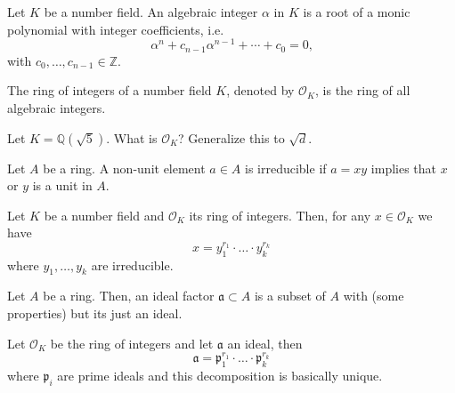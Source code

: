 %
\begin{defbox}
    \begin{definition}
        Let \(K\) be a number field. An algebraic integer \(\alpha\) in \(K\) is a root of a monic polynomial with integer coefficients, i.e.
        \begin{equation}
            \alpha^n + c_{n-1} \alpha^{n-1} + \cdots + c_0 = 0 \text{,}
        \end{equation}
        with \(c_{0}, \ldots, c_{n-1} \in \mathbb{Z}\).

        The ring of integers of a number field \(K\), denoted by \(\mathcal{O}_K\), is the ring of all algebraic integers.
    \end{definition}
\end{defbox}
\begin{example}
    Let \(K = \mathbb{Q}(\sqrt{5})\). What is \(\mathcal{O}_K\)? Generalize this to \(\sqrt{d}\).
\end{example}
%
\begin{defbox}
    \begin{definition}
        Let \(A\) be a ring. A non-unit element \(a \in A\) is irreducible if \(a = xy\) implies that \(x\) or \(y\) is a unit in \(A\).
    \end{definition}
\end{defbox}
%
\begin{thmbox}
    \begin{theorem}
        Let \(K\) be a number field and \(\mathcal{O}_K\) its ring of integers. Then, for any \(x \in \mathcal{O}_K\) we have
        \begin{equation*}
            x = y_1^{r_1} \cdot \ldots \cdot y_k^{r_k}
        \end{equation*}
        where \(y_1, \ldots, y_k\) are irreducible.
    \end{theorem}
\end{thmbox}
\begin{defbox}
    \begin{definition}
        Let \(A\) be a ring. Then, an ideal factor \(\mathfrak{a} \subset A\) is a subset of \(A\) with (some properties) but its just an ideal.
    \end{definition}
\end{defbox}
\begin{thmbox}
    \begin{theorem}
        Let \(\mathcal{O}_K\) be the ring of integers and let \(\mathfrak{a}\) an ideal, then
        \begin{equation*}
            \mathfrak{a} = \mathfrak{p}_1^{r_1} \cdot \ldots \cdot \mathfrak{p}_k^{r_k}
        \end{equation*}
        where \(\mathfrak{p}_i\) are prime ideals and this decomposition is basically unique.
    \end{theorem}
\end{thmbox}
